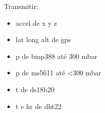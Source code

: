 \documentclass{article}
\begin{document}
Transmitir:
\begin{itemize}
    \item accel de x y z
    \item lat long alt de gps
    \item p de bmp388 até 300 mbar
    \item p de ms5611 até <300 mbar
    \item t de ds18b20
    \item t e hr de dht22
\end{itemize}
\end{document}
